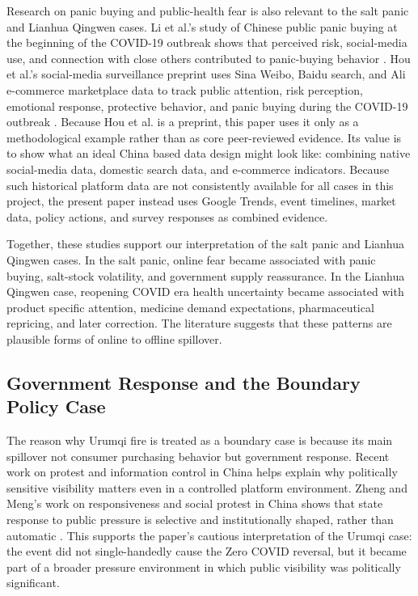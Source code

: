 \documentclass[conference]{IEEEtran}
\begin{document}
Research on panic buying and public-health fear is also relevant to the salt panic and Lianhua Qingwen cases. Li et al.'s study of Chinese public panic buying at the beginning of the COVID-19 outbreak shows that perceived risk, social-media use, and connection with close others contributed to panic-buying behavior \cite{li2022panic}. Hou et al.'s social-media surveillance preprint uses Sina Weibo, Baidu search, and Ali e-commerce marketplace data to track public attention, risk perception, emotional response, protective behavior, and panic buying during the COVID-19 outbreak \cite{hou2020public}. Because Hou et al. is a preprint, this paper uses it only as a methodological example rather than as core peer-reviewed evidence. Its value is to show what an ideal China based data design might look like: combining native social-media data, domestic search data, and e-commerce indicators. Because such historical platform data are not consistently available for all cases in this project, the present paper instead uses Google Trends, event timelines, market data, policy actions, and survey responses as combined evidence.

Together, these studies support our interpretation of the salt panic and Lianhua Qingwen cases. In the salt panic, online fear became associated with panic buying, salt-stock volatility, and government supply reassurance. In the Lianhua Qingwen case, reopening COVID era health uncertainty became associated with product specific attention, medicine demand expectations, pharmaceutical repricing, and later correction. The literature suggests that these patterns are plausible forms of online to offline spillover.

\subsection{Government Response and the Boundary Policy Case}

The reason why Urumqi fire is treated as a boundary case is because its main spillover not consumer purchasing behavior but government response. Recent work on protest and information control in China helps explain why politically sensitive visibility matters even in a controlled platform environment. Zheng and Meng's work on responsiveness and social protest in China shows that state response to public pressure is selective and institutionally shaped, rather than automatic \cite{zheng2021responsiveness}. This supports the paper's cautious interpretation of the Urumqi case: the event did not single-handedly cause the Zero COVID reversal, but it became part of a broader pressure environment in which public visibility was politically significant.
\end{document}
